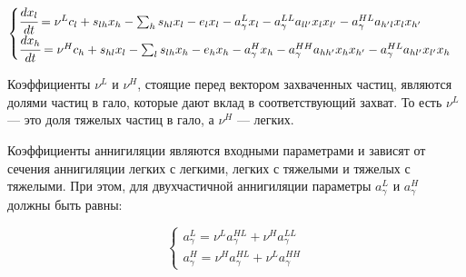 \begin{equation}
	\label{eq:evolution_inelastic}
	\begin{cases}
		\cfrac{d x_l}{d t} = \nu^L c_l + s_{lh} x_h - \sum_h{s_{hl}}x_l - e_l x_l - a_{\gamma}^{L} x_l - a_{\gamma}^{LL} a_{l l'} x_l x_{l'}  - a_{\gamma}^{HL} a_{h' l} x_l x_{h'}\\
		\cfrac{d x_h}{d t} = \nu^H c_h + s_{hl} x_l - \sum_l{s_{lh}}x_h - e_h x_h - a_{\gamma}^{H} x_h
		- a_{\gamma}^{HH} a_{h h'} x_h x_{h'}  - a_{\gamma}^{HL} a_{h l'} x_{l'} x_{h}\\
	\end{cases}
\end{equation}

Коэффициенты $\nu^L$ и $\nu^H$, стоящие перед вектором захваченных частиц, являются долями частиц в гало, которые дают вклад в соответствующий захват. То есть $\nu^L$ --- это доля тяжелых частиц в гало, а $\nu^H$ --- легких. 

Коэффициенты аннигиляции являются входными параметрами и зависят от сечения аннигиляции легких с легкими, легких с тяжелыми и тяжелых с тяжелыми. При этом, для двухчастичной аннигиляции параметры $a_{\gamma}^{L}$ и $a_{\gamma}^{H}$ должны быть равны:

\begin{equation}
	\label{eq:require_a_gamma}
	\begin{cases}
		a_{\gamma}^{L} = \nu^L a_{\gamma}^{HL} + \nu^H a_{\gamma}^{LL}\\
		a_{\gamma}^{H} = \nu^H a_{\gamma}^{HL} + \nu^L a_{\gamma}^{HH}
	\end{cases}
\end{equation}